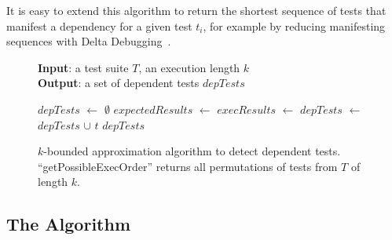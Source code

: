 It is easy to extend this algorithm to return the shortest sequence of
tests that manifest a dependency for a given test $t_i$, for example
by reducing manifesting sequences with Delta
Debugging~\cite{Zeller:2002}.


\begin{figure}[t]
\textbf{Input}: a test suite $\mathit{T}$, an execution length $\mathit{k}$\\
\textbf{Output}: a set of dependent tests $\mathit{depTests}$\\
\vspace{-5mm}
\begin{algorithmic}[1]
\STATE $\mathit{depTests}$ $\leftarrow$ $\emptyset$
\STATE $\mathit{expectedResults}$ $\leftarrow$
\STATE $\mathit{execResults}$ $\leftarrow$
\executeTestsInOrder{\testlist}
\STATE $\mathit{depTests}$ $\leftarrow$ $\mathit{depTests}$ $\cup$ $\mathit{t}$
\ENDIF
\ENDFOR
\ENDFOR
\RETURN $\mathit{depTests}$
\end{algorithmic}
\vspace{-3mm}
\caption{$k$-bounded approximation algorithm to detect dependent
tests. 
``getPossibleExecOrder'' returns all permutations of tests from $T$ of length $k$. 
} 
\label{fig:dtalgorithm}
\end{figure}


\subsection{The  Algorithm}
\label{sec:advalgorithm}

